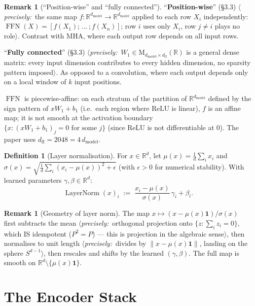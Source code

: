 \documentclass[11pt]{amsart}
\theoremstyle{plain}
\theoremstyle{definition}
\newtheorem{definition}[theorem]{Definition}
\newtheorem{remark}[theorem]{Remark}
\newcommand{\R}{\mathbb{R}}
\newcommand{\Mat}[2]{\mathrm{M}_{#1 \times #2}(\R)}
\newcommand{\LayerNorm}{\operatorname{LayerNorm}}
\newcommand{\FFN}{\operatorname{FFN}}
\newcommand{\precise}[1]{%
  $\langle$\textit{precisely:}~#1$\rangle$}
\begin{document}
\begin{remark}[``Position-wise'' and ``fully connected'']
``\textbf{Position-wise}'' (\S3.3) \precise{the same map $f : \R^{d_{\mathrm{model}}}
\to \R^{d_{\mathrm{model}}}$ applied to each row $X_i$ independently:
$\FFN(X) = [f(X_1);\, \ldots\,; f(X_n)]$; row $i$ uses only $X_i$, row $j \neq i$
plays no role}.  Contrast with MHA, where each output row depends on all input rows.

``\textbf{Fully connected}'' (\S3.3) \precise{$W_1 \in \Mat{d_{\mathrm{model}}}{d_{\mathrm{ff}}}$
is a general dense matrix: every input dimension contributes to every hidden
dimension, no sparsity pattern imposed}.  As opposed to a convolution, where each
output depends only on a local window of $k$ input positions.

$\FFN$ is piecewise-affine: on each stratum of the partition of
$\R^{d_{\mathrm{model}}}$ defined by the sign pattern of $xW_1+b_1$ (i.e.\ each
region where $\mathrm{ReLU}$ is linear), $f$ is an affine map; it is not smooth
at the activation boundary $\{x : (xW_1+b_1)_j = 0 \text{ for some } j\}$
(since $\mathrm{ReLU}$ is not differentiable at $0$).  The paper uses
$d_{\mathrm{ff}} = 2048 = 4\,d_{\mathrm{model}}$.
\end{remark}

\begin{definition}[Layer normalisation]
\label{def:layernorm}
For $x \in \R^d$, let $\mu(x) = \frac{1}{d}\sum_i x_i$ and
$\sigma(x) = \sqrt{\frac{1}{d}\sum_i (x_i - \mu(x))^2 + \epsilon}$
(with $\epsilon > 0$ for numerical stability).  With learned parameters
$\gamma, \beta \in \R^d$:
\[
    \LayerNorm(x)_i \;:=\; \frac{x_i - \mu(x)}{\sigma(x)}\,\gamma_i + \beta_i.
\]
\end{definition}

\begin{remark}[Geometry of layer norm]
The map $x \mapsto (x - \mu(x)\mathbf{1})/\sigma(x)$ first subtracts the mean
\precise{orthogonal projection onto $\{z : \sum_i z_i = 0\}$, which IS
idempotent ($P^2 = P$) --- this is projection in the algebraic sense},
then normalises to unit length \precise{divides by $\|x - \mu(x)\mathbf{1}\|$,
landing on the sphere $S^{d-1}$}, then rescales and shifts by the learned
$(\gamma, \beta)$.  The full map is smooth on
$\R^d \setminus \{\mu(x)\mathbf{1}\}$.
\end{remark}

\section{The Encoder Stack}
\label{sec:encoder}
\end{document}

